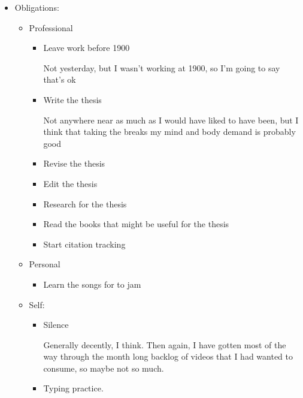 \documentclass[12pt]{article}
\renewcommand{\,}{\textsuperscript{,}}
\begin{document}
\begin{itemize}

\item Obligations:

\begin{itemize}

\item Professional

\begin{itemize}

\item Leave work before 1900

Not yesterday, but I wasn't working at 1900, so I'm going to say that's ok

\item Write the thesis

Not anywhere near as much as I would have liked to have been, but I think that taking the breaks my mind and body demand is probably good

\item Revise the thesis

\item Edit the thesis

\item Research for the thesis

\item Read the books that might be useful for the thesis

\item Start citation tracking

\end{itemize}

\item Personal

\begin{itemize}

\item Learn the songs for to jam

\end{itemize}

\item Self:

\begin{itemize}

\item Silence

Generally decently, I think. Then again, I have gotten most of the way through the month long backlog of videos that I had wanted to consume, so maybe not so much.

\item Typing practice.


\end{itemize}
\end{itemize}
\end{itemize}
\end{document}
